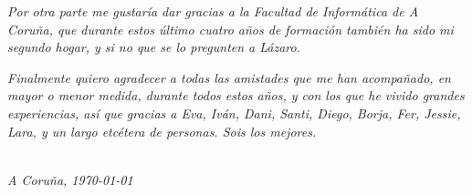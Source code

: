 \textit{Por otra parte me gustaría dar gracias a la Facultad de Informática de A Coruña, que durante estos último cuatro años de formación también ha sido mi segundo hogar, y si no que se lo pregunten a Lázaro.}\par

\vspace*{1em}

\textit{Finalmente quiero agradecer a todas las amistades que me han acompañado, en mayor o menor medida, durante todos estos años, y con los que he vivido grandes experiencias, así que gracias a Eva, Iván, Dani, Santi, Diego, Borja, Fer, Jessie, Lara, y un largo etcétera de personas. Sois los mejores.}\par

\vspace*{\fill}

\begin{flushright}
	\authors \\
	\textit{A Coruña, \today}
\end{flushright}